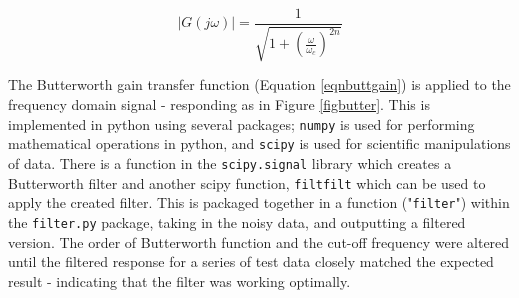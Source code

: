 \documentclass[twoside,a4]{report}
\def\br{\newline \newline \noindent}
\begin{document}
	\begin{equation}
		|G(j\omega)| = \frac{1}{\sqrt{1 + \left(\frac{\omega}{\omega_c}\right)^{2n}}}
		\label{eqnbuttgain}
	\end{equation}
	
	
	\noindent
	The Butterworth gain transfer function (Equation \ref{eqnbuttgain}) is applied to the frequency domain signal - responding as in Figure \ref{figbutter}.
	This is implemented in python using several packages; \texttt{numpy} \cite{numpyref} is used for performing mathematical operations in python, and \texttt{scipy} \cite{scipyref} is used for scientific manipulations of data. \br
	There is a function in the \texttt{scipy.signal} library which creates a Butterworth filter and another scipy function, \texttt{filtfilt} which can be used to apply the created filter. This is packaged together in a function ("\texttt{filter}") within the \texttt{filter.py} package, taking in the noisy data, and outputting a filtered version. The order of Butterworth function and the cut-off frequency were altered until the filtered response for a series of test data closely matched the expected result - indicating that the filter was working optimally.
	
\end{document}
